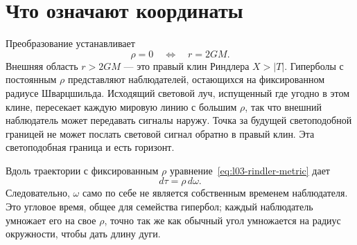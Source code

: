\begin{classroomqa}
\end{classroomqa}

\section{Что означают координаты}

Преобразование устанавливает
\begin{equation}
\rho=0\quad\Longleftrightarrow\quad r=2GM.
\end{equation}
Внешняя область \(r>2GM\) — это правый клин Риндлера \(X>|T|\). Гиперболы с постоянным \(\rho\) представляют наблюдателей, остающихся на фиксированном радиусе Шварцшильда. Исходящий световой луч, испущенный где угодно в этом клине, пересекает каждую мировую линию с большим \(\rho\), так что внешний наблюдатель может передавать сигналы наружу. Точка за будущей светоподобной границей не может послать световой сигнал обратно в правый клин. Эта светоподобная граница и есть горизонт.

\begin{classroomqa}
\end{classroomqa}

\begin{classroomqa}
\end{classroomqa}

Вдоль траектории с фиксированным \(\rho\) уравнение~\eqref{eq:l03-rindler-metric} дает
\begin{equation}
d\tau=\rho\,d\omega.
\label{eq:l03-proper-time-rindler}
\end{equation}
Следовательно, \(\omega\) само по себе не является собственным временем наблюдателя. Это угловое время, общее для семейства гипербол; каждый наблюдатель умножает его на свое \(\rho\), точно так же как обычный угол умножается на радиус окружности, чтобы дать длину дуги.

